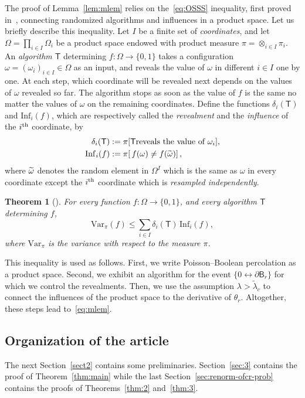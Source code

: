 \documentclass[10pt]{amsart}
\newtheorem{theo}{Theorem}[section]
\theoremstyle{definition}\newtheorem{defi}[theo]{Definition}\newtheorem{rema}[theo]{Remark}\newtheorem{exam}[theo]{Example}\newtheorem{exem}[theo]{Example}\newtheorem{nota}[theo]{Notation}
\newcommand{\var}{\mathrm{Var}}
\newcommand{\infl}{\mathrm{Inf}}
\let\oldtilde\tilde
\renewcommand*{\tilde}[1]{\mathchoice{\widetilde{#1}}{\widetilde{#1}}{\oldtilde{#1}}{\oldtilde{#1}}}
\begin{document}
The proof of Lemma~\ref{lem:mlem} relies on the~\eqref{eq:OSSS} inequality, first proved in~\cite{OSSS}, connecting randomized algorithms and influences in a product space. Let us briefly describe this inequality. Let $ I$ be a finite set of \emph{coordinates}, and let $\Omega =\prod_{i \in I} \Omega_i$ be a product space endowed with product measure $\pi =\otimes_{i \in I} \pi_i$. An \emph{algorithm $\mathsf T$} determining $f: \Omega \rightarrow \{0,1\}$ takes a configuration $\omega=(\omega_i)_{i\in I}\in\Omega$ as an input, and reveals the value of $\omega$ in different $i\in I$ one by one. At each step, which coordinate will be revealed next depends on the values of $\omega$ revealed so far. The algorithm stops as soon as the value of $f$ is the same no matter the values of $\omega$ on the remaining coordinates. Define the functions $\delta_i(\mathsf T)$ and $\infl_{i}(f)$, which are respectively called the \emph{revealment} and the \emph{influence} of the $i^{\rm th}$ coordinate, by
\begin{align*}
\delta_i(\mathsf T) &:= \pi[\mathsf T \text{reveals the value of } \omega_i],\\
\infl_i(f) &:= \pi [\, f (\omega) \neq f(\tilde\omega)]\,,
\end{align*}
where $\tilde\omega$ denotes the random element in $\Omega^I$ which is the same as $\omega$ in every coordinate except the $i^{\rm th}$ coordinate which is \emph{resampled independently}.
\begin{theo}[\cite{OSSS}] \label{thm:OSSS2}
For every function $f: \Omega \rightarrow \{0,1\}$, and every algorithm $\mathsf T$ determining $f$,
\begin{equation}\label{eq:OSSS}
\tag{OSSS}
\var_\pi (f) \leq \sum_{i\in I} \delta_{i}(\mathsf T) \, \infl_{i}(f),
\end{equation}
where $\var_\pi$ is the variance with respect to the measure $\pi$.
\end{theo}

This inequality is used as follows. First, we write Poisson--Boolean percolation as a product space. Second, we exhibit an algorithm for the event $\{0\leftrightarrow\partial\mathsf B_r \}$ for which we control the revealments. Then, we use the assumption $\lambda > \widetilde\lambda_c$ to connect the influences of the product space to the derivative of $\theta_r$. Altogether, these steps lead to~\eqref{eq:mlem}.

\subsection*{Organization of the article}
The next Section~\ref{sect2} contains some preliminaries. Section~\ref{sec:3} contains the proof of Theorem~\ref{thm:main} while the last Section~\ref{sec:renorm-ofcr-prob} contains the proofs of Theorems~\ref{thm:2} and~\ref{thm:3}.
\end{document}
